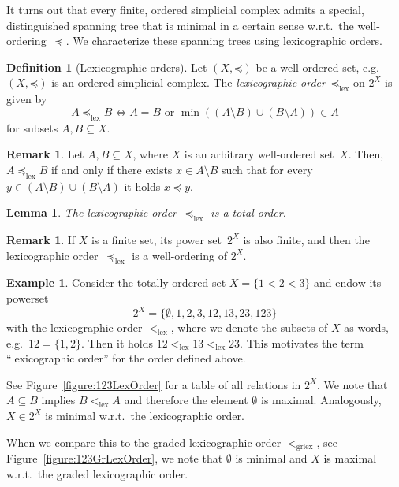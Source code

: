 \documentclass[oneside]{amsart}
\newtheorem{lemma}[theorem]{Lemma}
\theoremstyle{definition}
\newtheorem{definition}[theorem]{Definition}
\newtheorem{example}[theorem]{Example}
\newtheorem{remark}[theorem]{Remark}
\newcommand\lex{\mathrm{lex}}
\newcommand\grlex{\mathrm{grlex}}
\begin{document}
It turns out that every finite, ordered simplicial complex admits a special, distinguished spanning tree that is minimal in a certain sense w.r.t.\ the well-ordering~$\preceq$.
We characterize these spanning trees using lexicographic orders.

\begin{definition}[Lexicographic orders]
    Let $(X, \mathord\preceq)$ be a well-ordered set, e.g.\ $(X, \mathord\preceq)$ is an ordered simplicial complex.
    The \emph{lexicographic order}~$\mathord\preceq_\lex$ on $2^X$ is given by
    \[ A \preceq_\lex B \iff A = B \text{ or } \min((A \setminus B) \cup (B \setminus A)) \in A \]
    for subsets $A, B \subseteq X$.
\end{definition}

\begin{remark}
    Let $A, B \subseteq X$, where $X$ is an arbitrary well-ordered set~$X$.
    Then, $A \preceq_\lex B$ if and only if there exists $x \in A \setminus B$ such that for every $y \in (A \setminus B) \cup (B \setminus A)$ it holds $x \preceq y$.
\end{remark}

\begin{lemma}%
    \label{lemma:LexTotalOrder}
    The lexicographic order~$\preceq_\lex$ is a total order.
\end{lemma}

\begin{remark}
    If $X$ is a finite set, its power set~$2^X$ is also finite, and then the lexicographic order~$\preceq_\lex$ is a well-ordering of $2^X$.
\end{remark}

\begin{example}
    Consider the totally ordered set $X = \{ 1 < 2 < 3 \}$ and endow its powerset
    \[ 2^X = \{ \emptyset, 1, 2, 3, 12, 13, 23, 123 \} \]
    with the lexicographic order $<_\lex$, where we denote the subsets of $X$ as words, e.g.\ $12 = \{ 1, 2 \}$.
    Then it holds $12 <_\lex 13 <_\lex 23$.
    This motivates the term \enquote{lexicographic order} for the order defined above.

    See Figure~\ref{figure:123LexOrder} for a table of all relations in $2^X$.
    We note that $A \subseteq B$ implies $B <_\lex A$ and therefore the element $\emptyset$ is maximal. Analogously, $X \in 2^X$ is minimal w.r.t.\ the lexicographic order.

    When we compare this to the graded lexicographic order $<_\grlex$, see Figure~\ref{figure:123GrLexOrder}, we note that $\emptyset$ is minimal and $X$ is maximal w.r.t.\ the graded lexicographic order.
\end{example}
\end{document}
